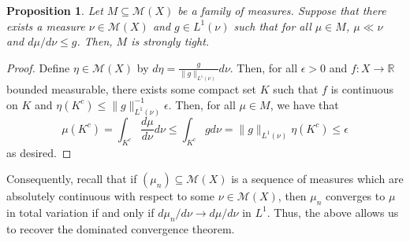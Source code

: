 \documentclass{article}
\newtheorem{proposition}{Proposition}
\begin{document}
\begin{proposition}
Let \(M \subseteq \mathcal{M}(X)\) be a family of measures. Suppose that there exists a measure
\(\nu \in \mathcal{M}(X)\) and \(g \in L^1(\nu)\) such that for all \(\mu \in M\), \(\mu \ll \nu\)
and \(d \mu / d \nu \le g\). Then, \(M\) is strongly tight.
\end{proposition}

\begin{proof}
Define \(\eta \in \mathcal{M}(X)\) by \(d \eta = \frac{g}{\|g\|_{L^1(\nu)}} d \nu\). Then, for
all \(\epsilon > 0\) and \(f : X \to \mathbb{R}\) bounded measurable, there exists some compact
set \(K\) such that \(f\) is continuous on \(K\) and \(\eta(K^c) \le \|g\|_{L^1(\nu)}^{-1}\epsilon\).
Then, for all \(\mu \in M\), we have that
\[\mu(K^c) = \int_{K^c} \frac{d \mu}{d \nu} d \nu \le \int_{K^c} g d \nu
    = \|g\|_{L^1(\nu)}\eta(K^c) \le \epsilon\]
as desired.
\end{proof}

Consequently, recall that if \((\mu_n) \subseteq \mathcal{M}(X)\) is a sequence of measures
which are absolutely continuous with respect to some \(\nu \in \mathcal{M}(X)\), then \(\mu_n\)
converges to \(\mu\) in total variation if and only if \(d \mu_n / d \nu \to d \mu / d \nu\)
in \(L^1\). Thus, the above allows us to recover the dominated convergence theorem.
\end{document}
